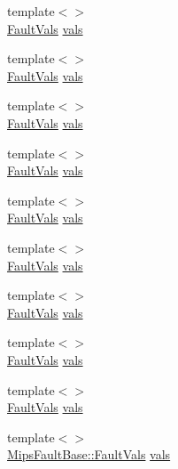\begin{DoxyCompactItemize}
\item 
{\footnotesize template$<$$>$ }\\\hyperlink{structMipsISA_1_1MipsFaultBase_1_1FaultVals}{FaultVals} \hyperlink{classMipsISA_1_1MipsFault_a8b3c2006cfd550d551232a82b397bbca}{vals}
\item 
{\footnotesize template$<$$>$ }\\\hyperlink{structMipsISA_1_1MipsFaultBase_1_1FaultVals}{FaultVals} \hyperlink{classMipsISA_1_1MipsFault_a8b3c2006cfd550d551232a82b397bbca}{vals}
\item 
{\footnotesize template$<$$>$ }\\\hyperlink{structMipsISA_1_1MipsFaultBase_1_1FaultVals}{FaultVals} \hyperlink{classMipsISA_1_1MipsFault_a8b3c2006cfd550d551232a82b397bbca}{vals}
\item 
{\footnotesize template$<$$>$ }\\\hyperlink{structMipsISA_1_1MipsFaultBase_1_1FaultVals}{FaultVals} \hyperlink{classMipsISA_1_1MipsFault_a8b3c2006cfd550d551232a82b397bbca}{vals}
\item 
{\footnotesize template$<$$>$ }\\\hyperlink{structMipsISA_1_1MipsFaultBase_1_1FaultVals}{FaultVals} \hyperlink{classMipsISA_1_1MipsFault_a8b3c2006cfd550d551232a82b397bbca}{vals}
\item 
{\footnotesize template$<$$>$ }\\\hyperlink{structMipsISA_1_1MipsFaultBase_1_1FaultVals}{FaultVals} \hyperlink{classMipsISA_1_1MipsFault_a8b3c2006cfd550d551232a82b397bbca}{vals}
\item 
{\footnotesize template$<$$>$ }\\\hyperlink{structMipsISA_1_1MipsFaultBase_1_1FaultVals}{FaultVals} \hyperlink{classMipsISA_1_1MipsFault_a8b3c2006cfd550d551232a82b397bbca}{vals}
\item 
{\footnotesize template$<$$>$ }\\\hyperlink{structMipsISA_1_1MipsFaultBase_1_1FaultVals}{FaultVals} \hyperlink{classMipsISA_1_1MipsFault_a8b3c2006cfd550d551232a82b397bbca}{vals}
\item 
{\footnotesize template$<$$>$ }\\\hyperlink{structMipsISA_1_1MipsFaultBase_1_1FaultVals}{FaultVals} \hyperlink{classMipsISA_1_1MipsFault_a8b3c2006cfd550d551232a82b397bbca}{vals}
\item 
{\footnotesize template$<$$>$ }\\\hyperlink{structMipsISA_1_1MipsFaultBase_1_1FaultVals}{MipsFaultBase::FaultVals} \hyperlink{classMipsISA_1_1MipsFault_a50008688f18bfb8180039ca4b99b552f}{vals}
\end{DoxyCompactItemize}
